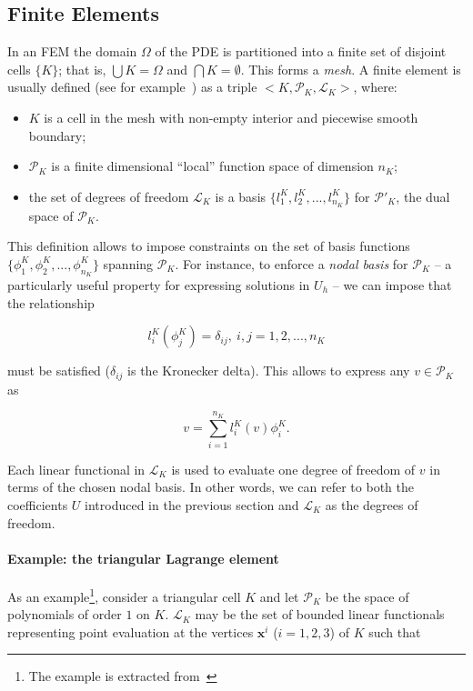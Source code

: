 \subsection{Finite Elements}
In an FEM the domain $\Omega$ of the PDE is partitioned into a finite set of disjoint cells $\lbrace K \rbrace$; that is, $\bigcup K = \Omega$ and $\bigcap K = \emptyset$. This forms a {\em mesh}. A finite element is usually defined (see for example~\cite{brenner-and-scott}) as a triple ${<}K,\mathcal{P}_K,\mathcal{L}_K{>}$, where:
\begin{itemize}
\item $K$ is a cell in the mesh with non-empty interior and piecewise smooth boundary;
\item $\mathcal{P}_K$ is a finite dimensional ``local'' function space of dimension $n_K$;
\item the set of degrees of freedom $\mathcal{L}_K$ is a basis $\lbrace l_1^K, l_2^K, ..., l_{n_K}^K\rbrace$ for $\mathcal{P}'_K$, the dual space of $\mathcal{P}_K$. 
\end{itemize}
This definition allows to impose constraints on the set of basis functions $\lbrace \phi_1^K, \phi_2^K, ..., \phi_{n_K}^K\rbrace$ spanning $\mathcal{P}_K$. For instance, to enforce a {\em nodal basis} for $\mathcal{P}_K$ -- a particularly useful property for expressing solutions in $U_h$ -- we can impose that the relationship

\begin{equation}
l_i^K(\phi_j^K) = \delta_{ij},\ i,j = 1,2,...,n_K
\end{equation}

must be satisfied ($\delta_{ij}$ is the Kronecker delta). This allows to express any $v \in \mathcal{P}_K$ as

\begin{equation}
v = \sum_{i=1}^{n_K} l_i^K(v) \phi_i^K.
\end{equation}

Each linear functional in $\mathcal{L}_K$ is used to evaluate one degree of freedom of $v$ in terms of the chosen nodal basis. In other words, we can refer to both the coefficients $U$ introduced in the previous section and $\mathcal{L}_K$ as the degrees of freedom.

\paragraph{Example: the triangular Lagrange element}
As an example\footnote{The example is extracted from~\cite{fenics-book}}, consider a triangular cell $K$ and let $\mathcal{P}_K$ be the space of polynomials of order $1$ on $K$. $\mathcal{L}_K$ may be the set of bounded linear functionals representing point evaluation at the vertices $\boldsymbol{x}^i$ ($i=1,2,3$) of $K$ such that

